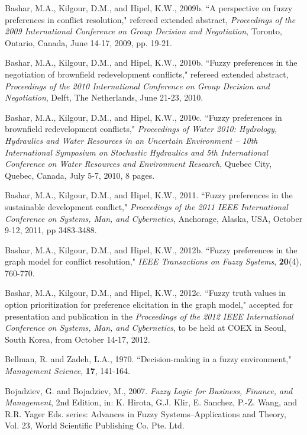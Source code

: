 \documentclass[letterpaper,12pt,titlepage,oneside,final]{book}
\begin{document}
\begin{thebibliography}{}
Bashar, M.A., Kilgour, D.M., and Hipel, K.W., 2009b. ``A perspective on fuzzy preferences in conflict resolution," refereed extended abstract, \emph{Proceedings of the 2009 International Conference on Group Decision and Negotiation}, Toronto, Ontario, Canada, June 14-17, 2009, pp. 19-21.

Bashar, M.A., Kilgour, D.M., and Hipel, K.W., 2010b. ``Fuzzy preferences in the negotiation of brownfield redevelopment conflicts," refereed extended abstract, \emph{Proceedings of the 2010 International Conference on Group Decision and Negotiation}, Delft, The Netherlands, June 21-23, 2010.

Bashar, M.A., Kilgour, D.M., and Hipel, K.W., 2010c. ``Fuzzy preferences in brownfield redevelopment conflicts," \emph{Proceedings of Water 2010: Hydrology, Hydraulics and Water Resources in an Uncertain Environment -- 10th International Symposium on Stochastic Hydraulics and 5th International Conference on Water Resources and Environment Research}, Quebec City, Quebec, Canada, July 5-7, 2010, 8 pages.

Bashar, M.A., Kilgour, D.M., and Hipel, K.W., 2011. ``Fuzzy preferences in the sustainable development conflict," \emph{Proceedings of the 2011 IEEE International Conference on Systems, Man, and Cybernetics}, Anchorage, Alaska, USA, October 9-12, 2011, pp 3483-3488.

Bashar, M.A., Kilgour, D.M., and Hipel, K.W., 2012b. ``Fuzzy preferences in the graph model for conflict resolution," \emph{IEEE Transactions on Fuzzy Systems}, {\bf 20}(4), 760-770.

Bashar, M.A., Kilgour, D.M., and Hipel, K.W., 2012c. ``Fuzzy truth values in option prioritization for preference elicitation in the graph model," accepted for presentation and publication in the \emph{Proceedings of the 2012 IEEE International Conference on Systems, Man, and Cybernetics}, to be held at COEX in Seoul, South Korea, from October 14-17, 2012.

Bellman, R. and Zadeh, L.A., 1970. ``Decision-making in a fuzzy environment," \emph{Management Science}, {\bf 17}, 141-164.

Bojadziev, G. and Bojadziev, M., 2007. \emph{Fuzzy Logic for Business, Finance, and Management}, 2nd Edition, in: K. Hirota, G.J. Klir, E. Sanchez, P.-Z. Wang, and R.R. Yager Eds. series: Advances in Fuzzy Systems--Applications and Theory, Vol. 23, World Scientific Publishing Co. Pte. Ltd.


\end{thebibliography}
\end{document}
